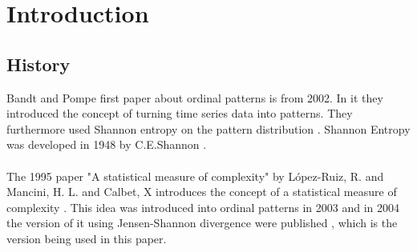 
\chapter{Introduction}
\section{History}
Bandt and Pompe first paper about ordinal patterns is from 2002. In it they introduced the concept of turning time series data into patterns. They furthermore used Shannon entropy on the pattern distribution \cite{Bandt2002}. Shannon Entropy was developed in 1948 by C.E.Shannon \cite{Shannon1948}. 
\\\\
The 1995 paper "A statistical measure of complexity" by López-Ruiz, R. and Mancini, H. L. and Calbet, X introduces the concept of a statistical measure of complexity 
 \cite{LopezRuiz1995}. This idea was introduced into ordinal patterns in 2003 \cite{Martin2003} and in 2004 the version of it using Jensen-Shannon divergence were published \cite{Lamberti2004}, which is the version being used in this paper.

